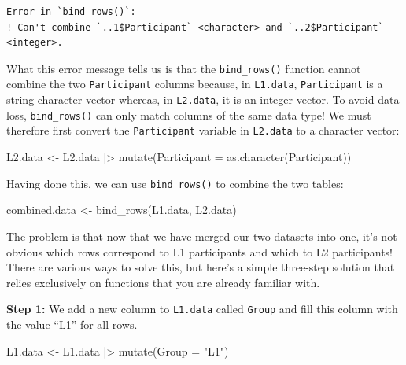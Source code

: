 \documentclass[
  letterpaper,
  DIV=11,
  numbers=noendperiod]{scrreprt}
\newenvironment{Shaded}{\begin{snugshade}}{\end{snugshade}}
\newcommand{\AttributeTok}[1]{\textcolor[rgb]{0.40,0.45,0.13}{#1}}
\newcommand{\FunctionTok}[1]{\textcolor[rgb]{0.28,0.35,0.67}{#1}}
\newcommand{\NormalTok}[1]{\textcolor[rgb]{0.00,0.23,0.31}{#1}}
\newcommand{\OtherTok}[1]{\textcolor[rgb]{0.00,0.23,0.31}{#1}}
\newcommand{\SpecialCharTok}[1]{\textcolor[rgb]{0.37,0.37,0.37}{#1}}
\newcommand{\StringTok}[1]{\textcolor[rgb]{0.13,0.47,0.30}{#1}}
\begin{document}
\begin{verbatim}
Error in `bind_rows()`:
! Can't combine `..1$Participant` <character> and `..2$Participant` <integer>.
\end{verbatim}

What this error message tells us is that the \texttt{bind\_rows()}
function cannot combine the two \texttt{Participant} columns because, in
\texttt{L1.data}, \texttt{Participant} is a string character vector
whereas, in \texttt{L2.data}, it is an integer vector. To avoid data
loss, \texttt{bind\_rows()} can only match columns of the same data
type! We must therefore first convert the \texttt{Participant} variable
in \texttt{L2.data} to a character vector:

\begin{Shaded}
\begin{Highlighting}[]
\NormalTok{L2.data }\OtherTok{\textless{}{-}}\NormalTok{ L2.data }\SpecialCharTok{|\textgreater{}} 
  \FunctionTok{mutate}\NormalTok{(}\AttributeTok{Participant =} \FunctionTok{as.character}\NormalTok{(Participant))}
\end{Highlighting}
\end{Shaded}

Having done this, we can use \texttt{bind\_rows()} to combine the two
tables:

\begin{Shaded}
\begin{Highlighting}[]
\NormalTok{combined.data }\OtherTok{\textless{}{-}} \FunctionTok{bind\_rows}\NormalTok{(L1.data, L2.data)}
\end{Highlighting}
\end{Shaded}

The problem is that now that we have merged our two datasets into one,
it's not obvious which rows correspond to L1 participants and which to
L2 participants! There are various ways to solve this, but here's a
simple three-step solution that relies exclusively on functions that you
are already familiar with.

\textbf{Step 1:} We add a new column to \texttt{L1.data} called
\texttt{Group} and fill this column with the value ``L1'' for all rows.

\begin{Shaded}
\begin{Highlighting}[]
\NormalTok{L1.data }\OtherTok{\textless{}{-}}\NormalTok{ L1.data }\SpecialCharTok{|\textgreater{}} 
  \FunctionTok{mutate}\NormalTok{(}\AttributeTok{Group =} \StringTok{"L1"}\NormalTok{)}
\end{Highlighting}
\end{Shaded}
\end{document}
